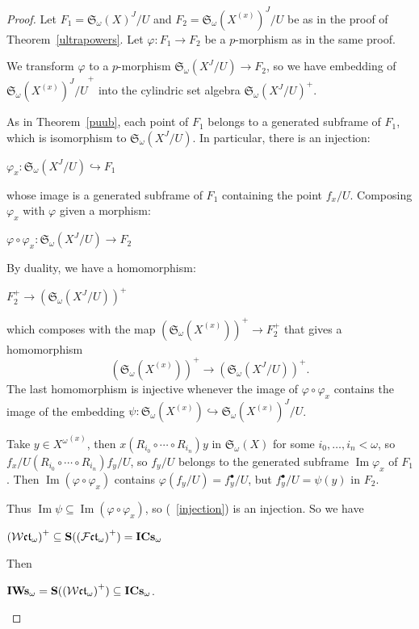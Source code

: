 \documentclass{article}
\theoremstyle{defin}
\theoremstyle{theorem}
\theoremstyle{claim}
\theoremstyle{prop}
\theoremstyle{lemma}
\theoremstyle{fact}
\theoremstyle{remark}
\theoremstyle{ex}
\theoremstyle{col}
\theoremstyle{question}
\begin{document}
\begin{proof}
  Let $F_1 = {\mathfrak{S}_{\omega}(X)}^J/U$ and $F_2 = {\mathfrak{S}_{\omega}(X^{(x)})}^J/U$ be as in the proof
  of Theorem~\ref{ultrapowers}. Let $\varphi : F_1 \to F_2$ be a $p$-morphism as in the same proof.

  We transform $\varphi$ to a $p$-morphism $\mathfrak{S}_{\omega}(X^J/U) \to F_2$, so we have embedding of 
  ${{\mathfrak{S}_{\omega}(X^{(x)})}^J/U}^+$ into the cylindric set algebra ${\mathfrak{S}_{\omega}(X^J/U)}^+$.

  As in Theorem~\ref{puub}, each point of $F_1$ belongs to a generated subframe of $F_1$, which is isomorphism
  to $\mathfrak{S}_{\omega}(X^J/U)$. In particular, there is an injection:

  \begin{center}
    $\varphi_x : \mathfrak{S}_{\omega}(X^J/U) \hookrightarrow F_1$
  \end{center}
  whose image is a generated subframe of $F_1$ containing the point $f_x/U$. 
  Composing $\varphi_x$ with $\varphi$ given a morphism:
  \begin{center}
    $\varphi \circ \varphi_x : \mathfrak{S}_{\omega}(X^J/U) \to F_2$
  \end{center}
  By duality, we have a homomorphism:
  \begin{center}
    $F_2^+ \to {(\mathfrak{S}_{\omega}(X^J/U))}^+$
  \end{center}
  which composes with the map ${(\mathfrak{S}_{\omega}(X^{(x)}))}^+ \to F_2^+$ that gives a homomorphism
  \begin{equation} \label{injection}
    {(\mathfrak{S}_{\omega}(X^{(x)}))}^+ \to {(\mathfrak{S}_{\omega}(X^J/U))}^+.
  \end{equation}
  The last homomorphism is injective whenever the image of 
  $\varphi \circ \varphi_x$ contains the image of the embedding 
  $\psi : \mathfrak{S}_{\omega}(X^{(x)}) \hookrightarrow {\mathfrak{S}_{\omega}(X^{(x)})}^J/U$.

  Take $y \in {X^{\omega}}^{(x)}$, then $x (R_{i_0} \circ \cdots \circ R_{i_n}) y$ in 
  $\mathfrak{S}_{\omega}(X)$ for some $i_0, \ldots, i_n < \omega$, so 
  $f_x/U (R_{i_0} \circ \cdots \circ R_{i_n}) f_y/U$, so $f_y/U$ belongs to the 
  generated subframe $\operatorname{Im} \varphi_x$ of $F_1$. 
  Then $\operatorname{Im}(\varphi \circ \varphi_x)$ contains $\varphi(f_y / U) = f^{\bullet}_y / U$,
  but $f^{\bullet}_y / U = \psi(y)$ in $F_2$.

  Thus $\operatorname{Im}\psi \subseteq \operatorname{Im}(\varphi \circ \varphi_x)$, 
  so (~\ref{injection}) is an injection. So we have
  \begin{center}
    ${(\mathcal{W}\mathfrak{ct}_{\omega})}^+ \subseteq {\bf S}({(\mathcal{F}\mathfrak{ct}_{\omega})}^+) = {\bf ICs}_{\omega}$
  \end{center}
  Then
  \begin{center}
    ${\bf IWs}_{\omega} = {\bf S} ({(\mathcal{W}\mathfrak{ct}_{\omega})}^+) \subseteq {\bf ICs}_{\omega}$.
  \end{center}
\end{proof}
\end{document}
